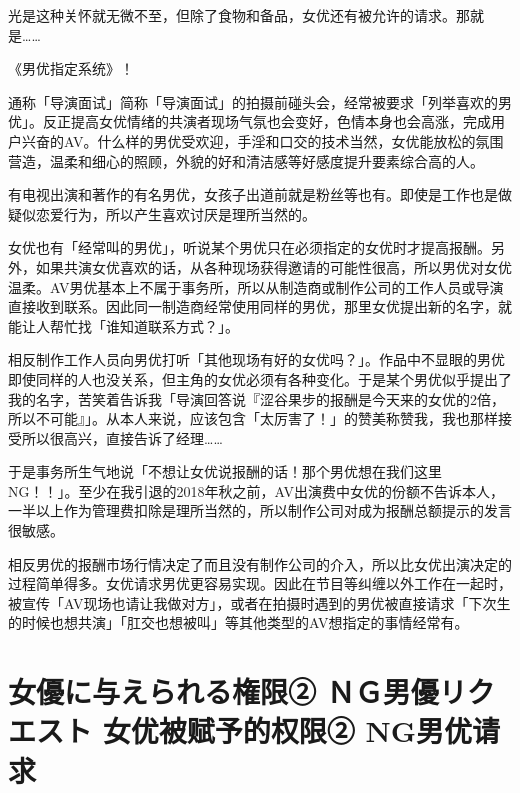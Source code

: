 \documentclass[12pt,UTF8]{ctexbook}
\begin{document}
光是这种关怀就无微不至，但除了食物和备品，女优还有被允许的请求。那就是……

《男优指定系统》！

通称「导演面试」简称「导演面试」的拍摄前碰头会，经常被要求「列举喜欢的男优」。反正提高女优情绪的共演者现场气氛也会变好，色情本身也会高涨，完成用户兴奋的AV。什么样的男优受欢迎，手淫和口交的技术当然，女优能放松的氛围营造，温柔和细心的照顾，外貌的好和清洁感等好感度提升要素综合高的人。

有电视出演和著作的有名男优，女孩子出道前就是粉丝等也有。即使是工作也是做疑似恋爱行为，所以产生喜欢讨厌是理所当然的。

女优也有「经常叫的男优」，听说某个男优只在必须指定的女优时才提高报酬。另外，如果共演女优喜欢的话，从各种现场获得邀请的可能性很高，所以男优对女优温柔。AV男优基本上不属于事务所，所以从制造商或制作公司的工作人员或导演直接收到联系。因此同一制造商经常使用同样的男优，那里女优提出新的名字，就能让人帮忙找「谁知道联系方式？」。

相反制作工作人员向男优打听「其他现场有好的女优吗？」。作品中不显眼的男优即使同样的人也没关系，但主角的女优必须有各种变化。于是某个男优似乎提出了我的名字，苦笑着告诉我「导演回答说『涩谷果步的报酬是今天来的女优的2倍，所以不可能』」。从本人来说，应该包含「太厉害了！」的赞美称赞我，我也那样接受所以很高兴，直接告诉了经理……

于是事务所生气地说「不想让女优说报酬的话！那个男优想在我们这里NG！！」。至少在我引退的2018年秋之前，AV出演费中女优的份额不告诉本人，一半以上作为管理费扣除是理所当然的，所以制作公司对成为报酬总额提示的发言很敏感。

相反男优的报酬市场行情决定了而且没有制作公司的介入，所以比女优出演决定的过程简单得多。女优请求男优更容易实现。因此在节目等纠缠以外工作在一起时，被宣传「AV现场也请让我做对方」，或者在拍摄时遇到的男优被直接请求「下次生的时候也想共演」「肛交也想被叫」等其他类型的AV想指定的事情经常有。

\section{女優に与えられる権限②
 ＮＧ男優リクエスト
女优被赋予的权限② NG男优请求}
\end{document}
